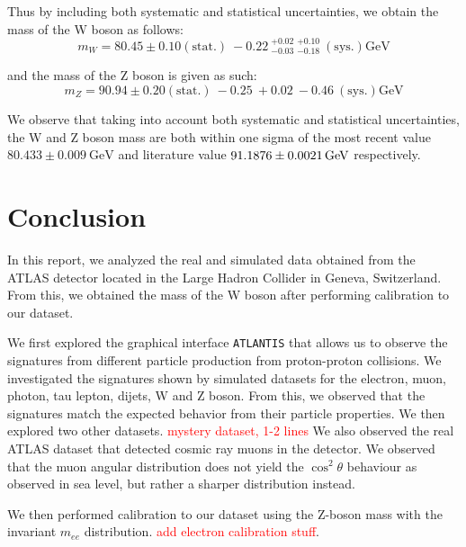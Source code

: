 \documentclass[a4paper]{report}
\numberwithin{equation}{section}
\begin{document}
Thus by including both systematic and statistical uncertainties, we obtain the mass of the W boson as follows:
\begin{equation}
    m_W = 80.45 \pm 0.10 (\mathrm{stat.}) \: -0.22 \: ^{+0.02}_{-0.03} \: ^{+0.10}_{-0.18} \: (\mathrm{sys.}) \si{\giga\electronvolt}
\end{equation}

and the mass of the Z boson is given as such: 
\begin{equation}
    m_Z = 90.94 \pm 0.20 (\mathrm{stat.}) \: -0.25 \: + 0.02 \: -0.46 \: (\mathrm{sys.}) \si{\giga\electronvolt}
\end{equation}

We observe that taking into account both systematic and statistical uncertainties, the W and Z boson mass are both 
within one sigma of the most recent value $80.433 \pm 0.009 \ \text{GeV}$ and literature value 
$\SI{91.1876 \pm 0.0021}{\giga\electronvolt}$ respectively. 

\chapter{Conclusion}

In this report, we analyzed the real and simulated data obtained from the ATLAS detector located in the Large Hadron 
Collider in Geneva, Switzerland. From this, we obtained the mass of the W boson after performing calibration 
to our dataset. \par 

We first explored the graphical interface \texttt{ATLANTIS} that allows us to observe the signatures from different particle 
production from proton-proton collisions. We investigated the signatures shown by simulated datasets for the 
electron, muon, photon, tau lepton, dijets, W and Z boson. From this, we observed that the signatures match the expected 
behavior from their particle properties. We then explored two other datasets. \textcolor{red}{mystery dataset, 1-2 lines}
We also observed the real ATLAS dataset that detected cosmic ray muons in the detector. We observed that the muon angular
distribution does not yield the $\cos^2 \theta$ behaviour as observed in sea level, but rather a sharper distribution instead. \par

We then performed calibration to our dataset using the Z-boson mass with the invariant $m_{ee}$ distribution. \textcolor{red}{add 
electron calibration stuff}. \par 
\end{document}
